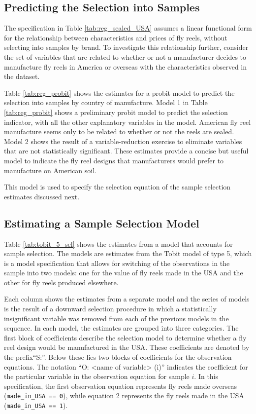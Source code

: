 \documentclass[11pt]{paper}
\begin{document}
\subsection{Predicting the Selection into Samples}


The specification in 
Table \ref{tab:reg_sealed_USA}
assumes a linear functional form for
the relationship between characteristics and prices of fly reels, 
without selecting into samples by brand.
% 
To investigate this relationship further, 
consider the set of variables that are related to
whether or not 
a manufacturer decides to manufacture fly reels in 
America or overseas
with the characteristics observed in the dataset. 



Table \ref{tab:reg_probit} 
shows the estimates for a probit model to predict the selection
into samples by country of manufacture.
% 
Model 1 in Table \ref{tab:reg_probit} 
shows a preliminary probit model to predict the selection indicator,
with all the other explanatory variables in the model.
American fly reel manufacture seems only to be related to 
whether or not the reels are sealed.
% 
Model 2 shows the result of a variable-reduction exercise
to eliminate variables that are not statistically significant.
These estimates provide a concise but useful model to
indicate the fly reel designs that manufacturers would 
prefer to manufacture on American soil.
% 

% 
This model is used to specify the selection equation
of the sample selection estimates discussed next. 


\subsection{Estimating a Sample Selection Model}

Table \ref{tab:tobit_5_sel} shows the estimates from a model that accounts for sample selection. 
The models are estimates from the Tobit model of type 5, 
which is a model specification that allows for switching 
of the observations in the sample into two models:
one for the value of fly reels made in the USA 
and the other for fly reels produced elsewhere.
% 

Each column shows the estimates from a separate model
and the series of models is the result of a downward selection
procedure in which a statistically insignificant variable
was removed from each of the previous models in the sequence. 
% 
In each model, the estimates are grouped into three categories.
% 
The first block of coefficients describe the selection model
to determine whether a fly reel design would be manufactured in the USA.
These coefficients are denoted by the prefix``S:''.
Below these lies two blocks of coefficients for the observation equations. 
The notation ``O: <name of variable> (i)''
indicates the coefficient for the particular variable
in the observation equation for sample $i$. 
In this specification, the first observation equation represents
fly reels made overseas (\texttt{made\_in\_USA == 0}), 
while equation 2 represents the fly reels made in the USA
(\texttt{made\_in\_USA == 1}).
\end{document}
